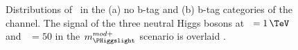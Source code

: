 \begin{figure}[h!]
\begin{center}
\end{center}
\caption[Distributions of \mTtot~in the no b-tag and b-tag categories
of the \tautau channel.]{Distributions of \mTtot~in the (a) no b-tag and (b) b-tag categories 
of the \tautau channel. The signal of the three neutral Higgs bosons at \mA~$=1\,\TeV$ 
and \tanb~$=50$ in the $m_{\PHiggslight}^{mod+}$ scenario is overlaid \cite{CMS-PAS-HIG-16-037}.}%
\label{fig:mssm_results_mttot_tt}
\end{figure}

